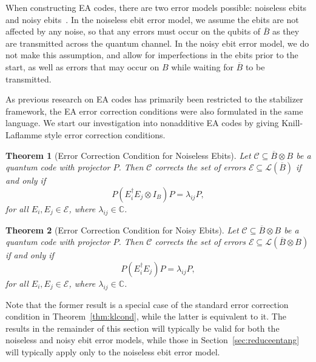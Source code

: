 \documentclass[]{amsart}
\newtheorem{theorem}{Theorem}
\begin{document}
When constructing EA codes, there are two error models possible: noiseless ebits~\cite{BDH2006} and noisy ebits~\cite{LB2012}.
In the noiseless ebit error model, we assume the ebits are not affected by any noise, so that any errors must occur on the qubits of $\overline{B}$ as they are transmitted across the quantum channel.
In the noisy ebit error model, we do not make this assumption, and allow for imperfections in the ebits prior to the start, as well as errors that may occur on $B$ while waiting for $\overline{B}$ to be transmitted.

As previous research on EA codes has primarily been restricted to the stabilizer framework, the EA error correction conditions were also formulated in the same language.
We start our investigation into nonadditive EA codes by giving Knill-Laflamme style error correction conditions.

\begin{theorem}[Error Correction Condition for Noiseless Ebits]
    Let $\mathcal{C}\subseteq\overline{B}\otimes B$ be a quantum code with projector $P$. Then $\mathcal{C}$ corrects the set of errors $\mathcal{E}\subseteq\mathcal{L}\!\left(\overline{B}\right)$ if and only if 
    \begin{equation}
        P\left(E_i^\dagger E_j\otimes I_B\right)P=\lambda_{ij}P,
    \end{equation}
    for all $E_i,E_j\in\mathcal{E}$, where $\lambda_{ij}\in\mathbb{C}$.
\end{theorem}

\begin{theorem}[Error Correction Condition for Noisy Ebits]
    Let $\mathcal{C}\subseteq\overline{B}\otimes B$ be a quantum code with projector $P$. Then $\mathcal{C}$ corrects the set of errors $\mathcal{E}\subseteq\mathcal{L}\!\left(\overline{B}\otimes B\right)$ if and only if 
    \begin{equation}
        P\left(E_i^\dagger E_j\right)P=\lambda_{ij}P,
    \end{equation}
    for all $E_i,E_j\in\mathcal{E}$, where $\lambda_{ij}\in\mathbb{C}$.
\end{theorem}

Note that the former result is a special case of the standard error correction condition in Theorem~\ref{thm:klcond}, while the latter is equivalent to it.
The results in the remainder of this section will typically be valid for both the noiseless and noisy ebit error models, while those in Section~\ref{sec:reduceentang} will typically apply only to the noiseless ebit error model.
\end{document}
